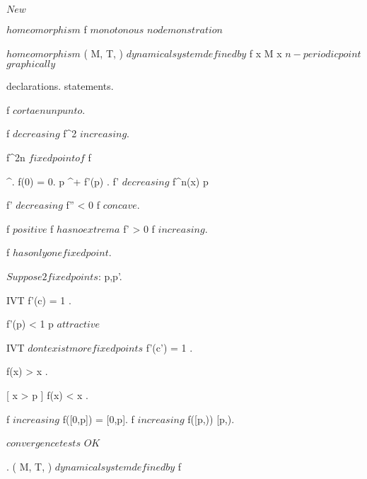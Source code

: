 \documentclass[../Main/main]{subfiles}
\begin{document}
\unit{ $ New $ }
{
	
	{
		{
			 $ homeomorphism $
		}
		\holds
		{
			f $ monotonous $
		}
		\demonstration
		{
			$ no demonstration $
		}
	}
	
	
	{
		{
			 $ homeomorphism $
			( M, T, \phi ) $ dynamical system defined by $ f
		}
		\holds
		{
			{
				\nexists \; x \in M \suchthat x $ n-periodic point $
			}
		}
		\demonstration
		{
			$graphically $
		}
	}
	
	
	{
		{
			declarations.
		}
		\showthat
		{
			statements.
		}
		\demonstration
		{
			f $ corta en un punto $.

			f $ decreasing $ \imp f^2 $ increasing $.

			f^{2n} \convergesto $ fixed point of $ f
		}
	}
	
	
	{
		{
			 \in \C^{\infty}.
			f(0) = 0.
			p \in \R^+ \nonzero \suchthat f'(p) \geq 0.
			f' $ decreasing $
		}
		\showthat
		{
			\all{ p \in \R^+ \nonzero }
			{
				f^n(x) \convergesto p
			}
		}
		\demonstration
		{
			f' $ decreasing $ \imp f'' < 0 \imp f $ concave $.

			f $ positive $ \imp f $ has no extrema $ \imp f' > 0 \imp f $ increasing $.


			f $ has only one fixed point $.

			$Suppose 2 fixed points $: p,p'.

			IVT \imp \ex{ c \in (0,p') }
			{
				f'(c) = 1
			}.

			f'(p) < 1 \imp p $ attractive $

			IVT \imp $ dont exist more fixed points $ \imp f'(c') = 1 \nleq 1.

			\all{ x \in (0,p) }
			{
				f(x) > x
			}.

			{
				f(x) < x
			}.

			f $ increasing $ \imp f([0,p]) = [0,p].
			f $ increasing $ \imp f([p,\infty)) \subset [p,\infty).

			$ convergence tests $ \imp $OK$
		}
	}
	
	
	{
		{
			.
			( M, T, \phi ) $ dynamical system defined by $ f
		}
		{
			{
			}
		}
	}
	
}
\end{document}
